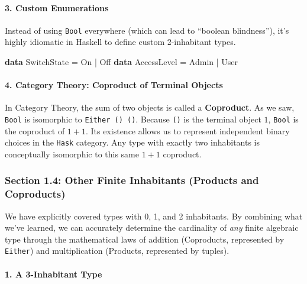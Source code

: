 \documentclass[
]{article}
\newenvironment{Shaded}{}{}
\newcommand{\DataTypeTok}[1]{\textcolor[rgb]{0.56,0.13,0.00}{#1}}
\newcommand{\KeywordTok}[1]{\textcolor[rgb]{0.00,0.44,0.13}{\textbf{#1}}}
\newcommand{\OperatorTok}[1]{\textcolor[rgb]{0.40,0.40,0.40}{#1}}
\newcommand{\OtherTok}[1]{\textcolor[rgb]{0.00,0.44,0.13}{#1}}
\begin{document}
\paragraph{3. Custom Enumerations}\label{custom-enumerations}

Instead of using \texttt{Bool} everywhere (which can lead to ``boolean
blindness''), it's highly idiomatic in Haskell to define custom
2-inhabitant types.

\begin{Shaded}
\begin{Highlighting}[]
\KeywordTok{data} \DataTypeTok{SwitchState} \OtherTok{=} \DataTypeTok{On} \OperatorTok{|} \DataTypeTok{Off}
\KeywordTok{data} \DataTypeTok{AccessLevel} \OtherTok{=} \DataTypeTok{Admin} \OperatorTok{|} \DataTypeTok{User}
\end{Highlighting}
\end{Shaded}

\paragraph{4. Category Theory: Coproduct of Terminal
Objects}\label{category-theory-coproduct-of-terminal-objects}

In Category Theory, the sum of two objects is called a
\textbf{Coproduct}. As we saw, \texttt{Bool} is isomorphic to
\texttt{Either\ ()\ ()}. Because \texttt{()} is the terminal object
\(1\), \texttt{Bool} is the coproduct of \(1 + 1\). Its existence allows
us to represent independent binary choices in the \texttt{Hask}
category. Any type with exactly two inhabitants is conceptually
isomorphic to this same \(1+1\) coproduct.

\subsubsection{Section 1.4: Other Finite Inhabitants (Products and
Coproducts)}\label{section-1.4-other-finite-inhabitants-products-and-coproducts}

We have explicitly covered types with 0, 1, and 2 inhabitants. By
combining what we've learned, we can accurately determine the
cardinality of \emph{any} finite algebraic type through the mathematical
laws of addition (Coproducts, represented by \texttt{Either}) and
multiplication (Products, represented by tuples).

\paragraph{1. A 3-Inhabitant Type}\label{a-3-inhabitant-type}
\end{document}
